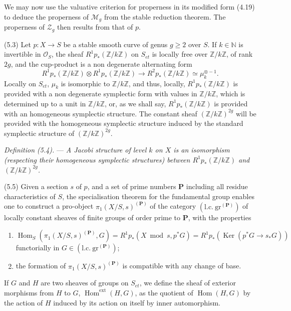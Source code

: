 \documentclass[10pt]{article}
\newcommand{\Hom}{\operatorname{Hom}}
\newcommand{\cO}{\mathcal O}
\begin{document}
We may now use the valuative criterion for properness in its modified form (4.19) to deduce the properness of $\mathcal M_g$ from the stable reduction theorem. The properness of $\mathcal Z_g$ then results from that of $p$.

\medskip
\noindent(5.3) Let $p:X\to S$ be a stable smooth curve of genus $g\geq2$ over $S$. If $k\in\mathbb N$ is invertible in $\cO_S$, the sheaf $R^1p_*(\mathbb Z/k\mathbb Z)$ on $S_{et}$ is locally free over $\mathbb Z/k\mathbb Z$, of rank $2g$, and the cup-product is a non degenerate alternating form
\[
R^1p_*(\mathbb Z/k\mathbb Z)\otimes R^1p_*(\mathbb Z/k\mathbb Z)
\longrightarrow R^2p_*(\mathbb Z/k\mathbb Z)\simeq\mu_k^{\otimes -1}.
\]
Locally on $S_{et}$, $\mu_k$ is isomorphic to $\mathbb Z/k\mathbb Z$, and thus, locally, $R^1p_*(\mathbb Z/k\mathbb Z)$ is provided with a non degenerate symplectic form with values in $\mathbb Z/k\mathbb Z$, which is determined up to a unit in $\mathbb Z/k\mathbb Z$, or, as we shall say, $R^1p_*(\mathbb Z/k\mathbb Z)$ is provided with an homogeneous symplectic structure. The constant sheaf $(\mathbb Z/k\mathbb Z)^{2g}$ will be provided with the homogeneous symplectic structure induced by the standard symplectic structure of $(\mathbb Z/k\mathbb Z)^{2g}$.

\medskip
\noindent\emph{Definition (5.4).} --- \emph{A Jacobi structure of level $k$ on $X$ is an isomorphism (respecting their homogeneous symplectic structures) between $R^1p_*(\mathbb Z/k\mathbb Z)$ and $(\mathbb Z/k\mathbb Z)^{2g}$.}

\medskip
\noindent(5.5) Given a section $s$ of $p$, and a set of prime numbers $\mathbf P$ including all residue characteristics of $S$, the specialisation theorem for the fundamental group enables one to construct a pro-object $\pi_1(X/S,s)^{(\mathbf P)}$ of the category $(\mathrm{l.c.}\ \mathrm{gr}^{(\mathbf P)})$ of locally constant sheaves of finite groups of order prime to $\mathbf P$, with the properties
\begin{enumerate}[label=(\roman*)]
\item $\Hom_S(\pi_1(X/S,s)^{(\mathbf P)},G)=R^1p_*(X\bmod s,p^*G)=R^1p_*(\operatorname{Ker}(p^*G\to s_*G))$ functorially in $G\in(\mathrm{l.c.}\ \mathrm{gr}^{(\mathbf P)})$;
\item the formation of $\pi_1(X/S,s)^{(\mathbf P)}$ is compatible with any change of base.
\end{enumerate}

If $G$ and $H$ are two sheaves of groups on $S_{et}$, we define the sheaf of exterior morphisms from $H$ to $G$, $\Hom^{\mathrm{ext}}(H,G)$, as the quotient of $\Hom(H,G)$ by the action of $H$ induced by its action on itself by inner automorphism.
\end{document}
